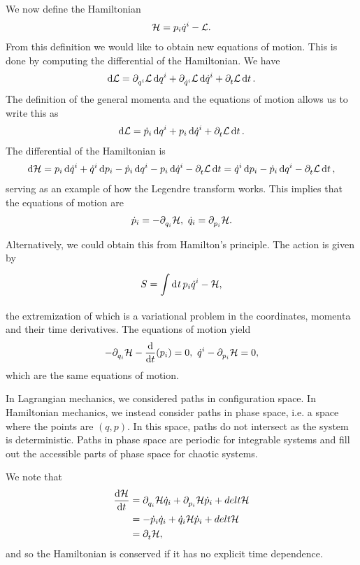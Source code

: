 We now define the Hamiltonian
\begin{align*}
	\mathcal{H} = p_{i}\dot{q}^{i} - \mathcal{L}.
\end{align*}
From this definition we would like to obtain new equations of motion. This is done by computing the differential of the Hamiltonian. We have
\begin{align*}
	\dd{\ensuremath{\mathcal{L}}} = \partial^{}_{q^{i}}\mathcal{L}\dd{q^{i}} + \partial^{}_{\dot{q}^{i}}\mathcal{L}\dd{\dot{q}^{i}} + \partial^{}_{t}\mathcal{L}\dd{t}.
\end{align*}
The definition of the general momenta and the equations of motion allows us to write this as
\begin{align*}
	\dd{\ensuremath{\mathcal{L}}} = \dot{p}_{i}\dd{q^{i}} + p_{i}\dd{\dot{q}^{i}} + \partial^{}_{t}\mathcal{L}\dd{t}.
\end{align*}
The differential of the Hamiltonian is
\begin{align*}
	\dd{\ensuremath{\mathcal{H}}} = p_{i}\dd{\dot{q}^{i}} + \dot{q}^{i}\dd{p_{i}} - \dot{p}_{i}\dd{q^{i}} - p_{i}\dd{\dot{q}^{i}} - \partial^{}_{t}\mathcal{L}\dd{t} = \dot{q}^{i}\dd{p_{i}} - \dot{p}_{i}\dd{q^{i}} - \partial^{}_{t}\mathcal{L}\dd{t},
\end{align*}
serving as an example of how the Legendre transform works. This implies that the equations  of motion are
\begin{align*}
	\dot{p}_{i} = -\partial^{}_{q_{i}}\mathcal{H},\ \dot{q}_{i} = \partial^{}_{p_{i}}\mathcal{H}.
\end{align*}

Alternatively, we could obtain this from Hamilton's principle. The action is given by
\begin{align*}
	S = \int\limits_{}^{}\dd[]{t}p_{i}\dot{q}^{i} - \mathcal{H},
\end{align*}
the extremization of which is a variational problem in the coordinates, momenta and their time derivatives. The equations of motion yield
\begin{align*}
	-\partial^{}_{q_{i}}\mathcal{H} - \dv{t}(p_{i}) = 0,\ \dot{q}^{i} - \partial^{}_{p_{i}}\mathcal{H} = 0,
\end{align*}
which are the same equations of motion.

In Lagrangian mechanics, we considered paths in configuration space. In Hamiltonian mechanics, we instead consider paths in phase space, i.e. a space where the points are $(q, p)$. In this space, paths do not intersect as the system is deterministic. Paths in phase space are periodic for integrable systems and fill out the accessible parts of phase space for chaotic systems.

We note that
\begin{align*}
	\dv{\ensuremath{\mathcal{H}}}{t} &= \partial^{}_{q_{i}}\mathcal{H}\dot{q}_{i} + \partial^{}_{p_{i}}\mathcal{H}\dot{p}_{i} + del{t}{\mathcal{H}} \\
	             &= -\dot{p}_{i}\dot{q}_{i} + \dot{q}_{i}{\mathcal{H}}\dot{p}_{i} + del{t}{\mathcal{H}} \\
	             &= \partial^{}_{t}\mathcal{H},
\end{align*}
and so the Hamiltonian is conserved if it has no explicit time dependence.

